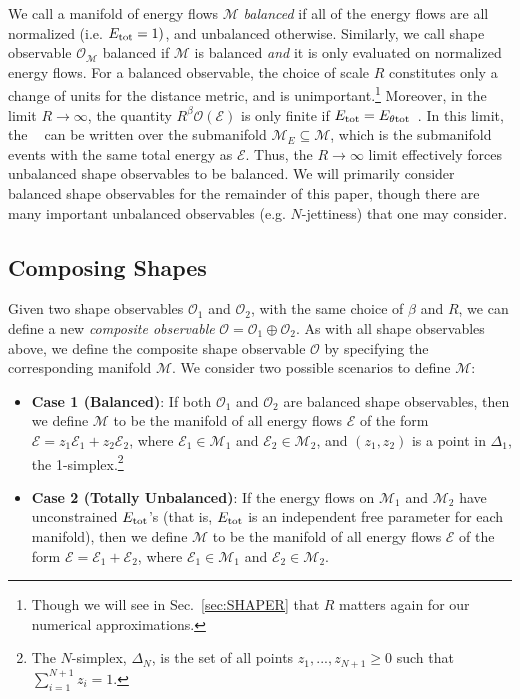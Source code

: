 \documentclass[letterpaper,11pt]{article}
\newcommand{\E}{\mathcal{E}}
\newcommand{\M}{\mathcal{M}}
\renewcommand{\O}{\mathcal{O}}
\DeclareMathOperator*{\paramin}{(arg)min}
\DeclareRobustCommand{\Sec}[1]{Sec.~\ref{sec:#1}}
\begin{document}
We call a manifold of energy flows $\M$ \emph{balanced} if all of the energy flows are all normalized (i.e. $E_{\rm tot} = 1)$, and unbalanced otherwise. Similarly, we call shape observable $\O_\M$ balanced if $\M$ is balanced \emph{and} it is only evaluated on normalized energy flows. For a balanced observable, the choice of scale $R$ constitutes only a change of units for the distance metric, and is unimportant.\footnote{Though we will see in \Sec{SHAPER} that $R$ matters again for our numerical approximations.} Moreover, in the limit $R\xrightarrow{}\infty$, the quantity $R^\beta \mathcal{O}(\E)$ is only finite if $E_{\rm tot} = E_{\theta \rm tot}$~\cite{2020}. In this limit, the $\paramin$ can be written over the submanifold $\M_{E} \subseteq \M$, which is the submanifold events with the same total energy as $\E$. Thus, the $R\to\infty$ limit effectively forces unbalanced shape observables to be balanced. We will primarily consider balanced shape observables for the remainder of this paper, though there are many important unbalanced observables (e.g. $N$-jettiness) that one may consider.


\subsection{Composing Shapes}\label{sec:composing}


Given two shape observables $\mathcal{O}_1$ and $\mathcal{O}_2$, with the same choice of $\beta$ and $R$, we can define a new \emph{composite observable} $\mathcal{O} = \mathcal{O}_1\oplus\mathcal{O}_2$. As with all shape observables above, we define the composite shape observable $\O$ by specifying the corresponding manifold $\M$. We consider two possible scenarios to define $\M$:

\begin{itemize}
    \item \textbf{Case 1 (Balanced)}: If both $\mathcal{O}_1$ and $\mathcal{O}_2$ are balanced shape observables,  then we define $\M$ to be the manifold of all energy flows $\E$ of the form $\E = z_1\E_1 + z_2\E_2$, where $\E_1 \in \M_1$ and $\E_2 \in \M_2$, and $(z_1, z_2)$ is a point in $\Delta_1$, the 1-simplex.\footnote{The $N$-simplex, $\Delta_N$, is the set of all points $z_1,...,z_{N+1} \geq 0$ such that $\sum_{i=1}^{N+1}z_i = 1$.} 
    \item \textbf{Case 2 (Totally Unbalanced)}: If the energy flows on $\M_1$ and $\M_2$ have unconstrained $E_{\rm tot}$'s (that is, $E_{\rm tot}$ is an independent free parameter for each manifold), then we define $\M$ to be the manifold of all energy flows $\E$ of the form $\E = \E_1 + \E_2$, where $\E_1 \in \M_1$ and $\E_2 \in \M_2$.
\end{itemize}
\end{document}

